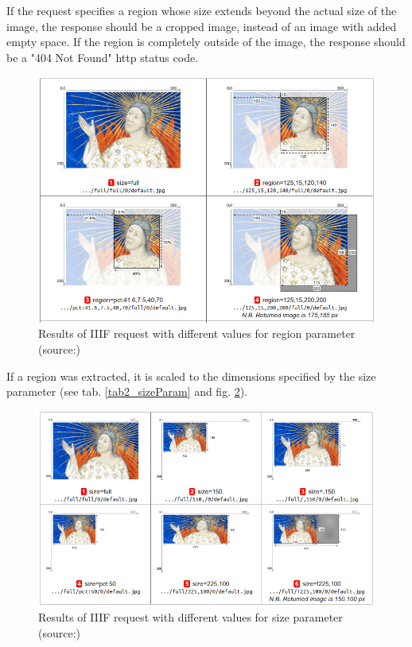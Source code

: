 If the request specifies a region whose size extends beyond the actual size of the image, the response should be a cropped image, instead of an image with added empty space. If the region is completely outside of the image, the response should be a "404 Not Found" http status code\cite{web:iiif}.

\begin{figure}[H]
	\begin{center}
		\includegraphics[scale=0.4]{img/region_param.png}
		\caption{Results of IIIF request with different values for region parameter (source:\cite{web:iiif})}
		\label{fig2_iiifRegion}
	\end{center}
\end{figure}

If a region was extracted, it is scaled to the dimensions specified by the size parameter (see tab. \ref{tab2_sizeParam} and fig. \ref{fig2_iiifSize}).

\begin{figure}[H]
	\begin{center}
		\includegraphics[scale=0.35]{img/size_parameter.png}
		\caption{Results of IIIF request with different values for size parameter (source:\cite{web:iiif})}
		\label{fig2_iiifSize}
	\end{center}
\end{figure}


